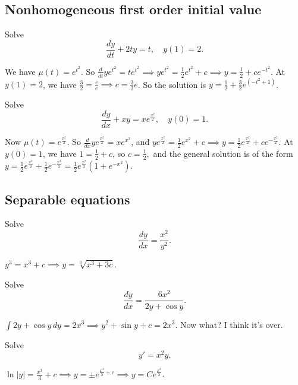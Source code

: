 \subsection{Nonhomogeneous first order initial value}
\begin{prob}
    Solve \[
        \frac{dy}{dt}+2ty=t,\quad y(1)=2.
    \] 
\end{prob}
\begin{solution}
    We have $\mu(t)=e^{t^2}$. So $\frac{d}{dt} y e^{t^2}=te^{t^2}\implies ye^{t^2}=\frac{1}{2}e^{t^2}+c\implies y=\frac{1}{2}+ce^{-t^2}.$ At $y(1)=2$, we have $\frac{3}{2}=\frac{c}{e}\implies c=\frac{3}{2}e$. So the solution is $y=\frac{1}{2}+\frac{3}{2}e^{(-t^2+1)}$.
\end{solution}
\begin{prob}
    Solve \[
        \frac{dy}{dx}+xy=xe^{\frac{x^2}{2}},\quad y(0)=1.
    \] 
\end{prob}
\begin{solution}
    Now $\mu(t)=e^{\frac{x^2}{2}}.$ So $\frac{d}{dx}ye^{\frac{x^2}{2}}=xe^{x^2}$, and $ye^{\frac{x^2}{2}}=\frac{1}{2}e^{x^2}+c\implies y=\frac{1}{2}e^{\frac{x^2}{2}}+ce^{-\frac{x^2}{2}}$. At $y(0)=1$, we have $1=\frac{1}{2}+c$, so $c=\frac{1}{2},$ and the general solution is of the form $y=\frac{1}{2}e^{\frac{x^2}{2}}+\frac{1}{2}e^{-\frac{x^2}{2}}=\frac{1}{2}e^{\frac{x^2}{2}}\left( 1+e^{-x^2} \right) $.
\end{solution}

\subsection{Separable equations}
\begin{prob}
    Solve \[
    \frac{dy}{dx}=\frac{x^2}{y^2}.
    \] 
\end{prob}
\begin{solution}
    $y^3=x^3+c\implies y=\sqrt[3]{x^3+3c} $.
\end{solution}
\begin{prob}
    Solve \[
    \frac{dy}{dx}=\frac{6x^2}{2y+\cos y}.
    \] 
\end{prob}
\begin{solution}
   $\int 2y+\cos y \, dy=2x^3\implies y^2+\sin y+c=2x^3$. Now what? I think it's over.
\end{solution}
\begin{prob}
    Solve  \[
    y'=x^2y.
    \] 
\end{prob}
\begin{solution}
    $\ln|y|=\frac{x^3}{3}+c\implies y=\pm e^{\frac{x^3}{3}+c}\implies y=Ce^{\frac{x^3}{3}}$.
\end{solution}

